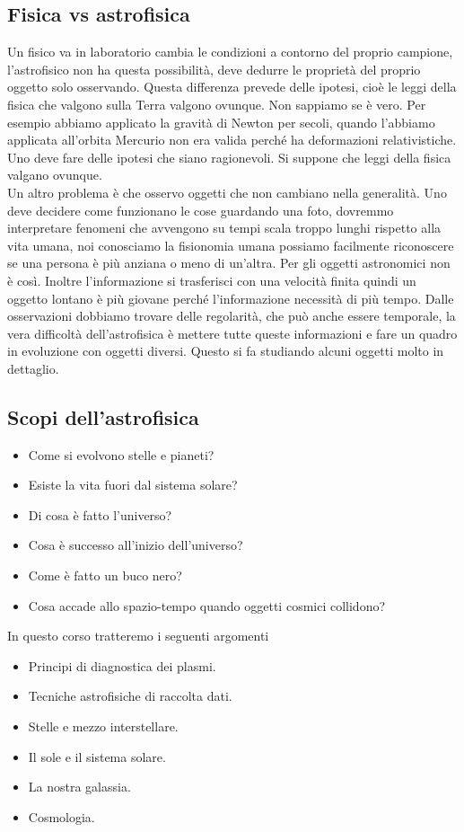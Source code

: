 \documentclass[a4paper,11pt]{article}
\begin{document}
\subsection{Fisica vs astrofisica}
 Un fisico va in laboratorio cambia le condizioni a contorno del proprio campione, l'astrofisico non ha questa possibilità, deve dedurre le proprietà del proprio oggetto solo osservando. Questa differenza prevede delle ipotesi, cioè le leggi della fisica che valgono sulla Terra valgono ovunque. Non sappiamo se è vero. Per esempio abbiamo applicato la gravità di Newton per secoli, quando l'abbiamo applicata all'orbita Mercurio non era valida perché ha deformazioni relativistiche. Uno deve fare delle ipotesi che siano ragionevoli. Si suppone che leggi della fisica valgano ovunque.\\
 Un altro problema è che osservo oggetti che non cambiano nella generalità. Uno deve decidere come funzionano le cose guardando una foto, dovremmo interpretare fenomeni che avvengono su tempi scala troppo lunghi rispetto alla vita umana, noi conosciamo la fisionomia umana possiamo facilmente riconoscere se una persona è più anziana o meno di un'altra. Per gli oggetti astronomici non è così. Inoltre l'informazione si trasferisci con una velocità finita quindi un oggetto lontano è più giovane perché l'informazione necessità di più tempo. Dalle osservazioni dobbiamo trovare delle regolarità, che può anche essere temporale, la vera difficoltà dell'astrofisica è mettere tutte queste informazioni e fare un quadro in evoluzione con oggetti diversi. Questo si fa studiando alcuni oggetti molto in dettaglio.

\subsection{Scopi dell'astrofisica}
\begin{itemize}
    \item Come si evolvono stelle e pianeti?
    \item Esiste la vita fuori dal sistema solare?
    \item Di cosa è fatto l'universo?
    \item Cosa è successo all'inizio dell'universo?
    \item Come è fatto un buco nero?
    \item Cosa accade allo spazio-tempo quando oggetti cosmici collidono?
\end{itemize}
In questo corso tratteremo i seguenti argomenti
\begin{itemize}
    \item Principi di diagnostica dei plasmi.
    \item Tecniche astrofisiche di raccolta dati.
    \item Stelle e mezzo interstellare.
    \item Il sole e il sistema solare.
    \item La nostra galassia.
    \item Cosmologia.
\end{itemize}
\end{document}
